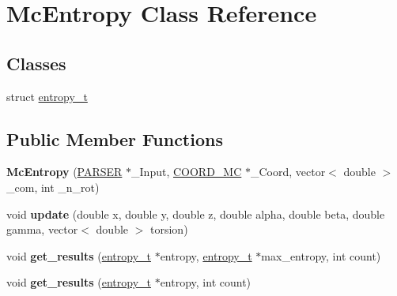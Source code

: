 \hypertarget{classMcEntropy}{
\section{McEntropy Class Reference}
\label{classMcEntropy}
}
\subsection*{Classes}
\begin{DoxyCompactItemize}
\item 
struct \hyperlink{structMcEntropy_1_1entropy__t}{entropy\_\-t}
\end{DoxyCompactItemize}
\subsection*{Public Member Functions}
\begin{DoxyCompactItemize}
\item 
\hypertarget{classMcEntropy_aefeb5643677c1e75519d8fe65033230a}{
{\bfseries McEntropy} (\hyperlink{classPARSER}{PARSER} $\ast$\_\-Input, \hyperlink{classCOORD__MC}{COORD\_\-MC} $\ast$\_\-Coord, vector$<$ double $>$ \_\-com, int \_\-n\_\-rot)}
\label{classMcEntropy_aefeb5643677c1e75519d8fe65033230a}

\item 
\hypertarget{classMcEntropy_ae6be1218461bd35bea36eb5befca1b5a}{
void {\bfseries update} (double x, double y, double z, double alpha, double beta, double gamma, vector$<$ double $>$ torsion)}
\label{classMcEntropy_ae6be1218461bd35bea36eb5befca1b5a}

\item 
\hypertarget{classMcEntropy_a6314618b4df20a6154fbdfa2bce6dc0f}{
void {\bfseries get\_\-results} (\hyperlink{structMcEntropy_1_1entropy__t}{entropy\_\-t} $\ast$entropy, \hyperlink{structMcEntropy_1_1entropy__t}{entropy\_\-t} $\ast$max\_\-entropy, int count)}
\label{classMcEntropy_a6314618b4df20a6154fbdfa2bce6dc0f}

\item 
\hypertarget{classMcEntropy_a400ddf907035ec30ec95374d22c1c359}{
void {\bfseries get\_\-results} (\hyperlink{structMcEntropy_1_1entropy__t}{entropy\_\-t} $\ast$entropy, int count)}
\label{classMcEntropy_a400ddf907035ec30ec95374d22c1c359}

\end{DoxyCompactItemize}
